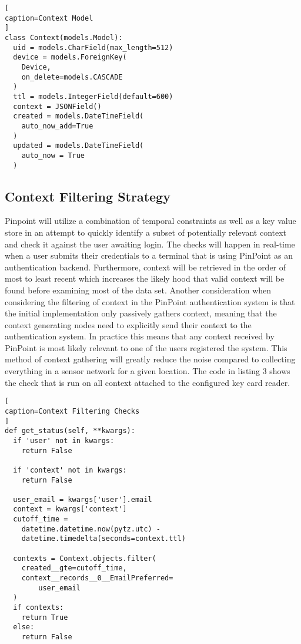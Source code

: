 \documentclass[11pt,journal]{IEEEtran}
\begin{document}
\begin{lstlisting}[
caption=Context Model
]
class Context(models.Model):
  uid = models.CharField(max_length=512)
  device = models.ForeignKey(
  	Device, 
  	on_delete=models.CASCADE
  )
  ttl = models.IntegerField(default=600)
  context = JSONField()
  created = models.DateTimeField(
  	auto_now_add=True
  )
  updated = models.DateTimeField(
  	auto_now = True
  )
\end{lstlisting}


\subsection{Context Filtering Strategy}
Pinpoint will utilize a combination of temporal constraints as well as a key value store in an attempt to quickly identify a subset of potentially relevant context and check it against the user awaiting login.  The checks will happen in real-time when a user submits their credentials to a terminal that is using PinPoint as an authentication backend.  Furthermore, context will be retrieved in the order of most to least recent which increases the likely hood that valid context will be found before examining most of the data set.  Another consideration when considering the filtering of context in the PinPoint authentication system is that the initial implementation only passively gathers context, meaning that the context generating nodes need to explicitly send their context to the authentication system.  In practice this means that any context received by PinPoint is most likely relevant to one of the users registered the system.  This method of context gathering will greatly reduce the noise compared to collecting everything in a sensor network for a given location.  The code in listing 3 shows the check that is run on all context attached to the configured key card reader.

\begin{lstlisting}[
caption=Context Filtering Checks
]
def get_status(self, **kwargs):
  if 'user' not in kwargs:
    return False

  if 'context' not in kwargs:
    return False

  user_email = kwargs['user'].email
  context = kwargs['context']
  cutoff_time = 
    datetime.datetime.now(pytz.utc) - 
    datetime.timedelta(seconds=context.ttl)

  contexts = Context.objects.filter(
    created__gte=cutoff_time, 
    context__records__0__EmailPreferred=
        user_email
  )
  if contexts:
    return True
  else:
    return False

\end{lstlisting}
\end{document}
